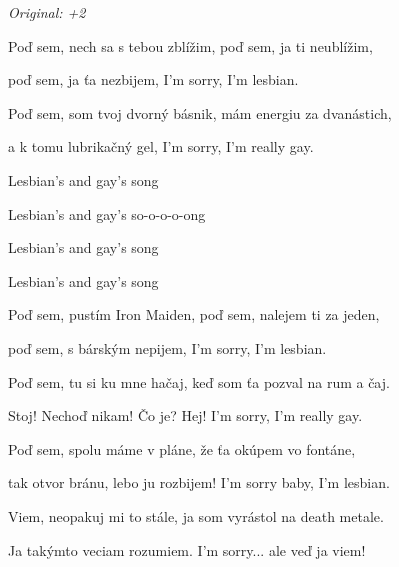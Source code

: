 \begin{song}


 \quad
\textit{Original: +2}

\large


\Large

\bigskip

 Poď sem, nech sa s tebou zblížim,  poď sem, ja ti neublížim, \par
{} poď sem, ja ťa nezbijem,  I'm sorry, I'm lesbian. \par
{} Poď sem, som tvoj dvorný básnik,  mám energiu za dvanástich, \par
{} a k tomu lubrikačný gel,  I'm sorry, I'm really gay. \par

\bigskip

\begin{chorusbox}{\Refren}
Lesbian's and gay's song \par
{}Lesbian's and gay's so-o-o-o-ong \par
{}Lesbian's and gay's song \par
{}Lesbian's and gay's song \par
\end{chorusbox}

\bigskip

 Poď sem, pustím Iron Maiden,  poď sem, nalejem ti za jeden, \par
{} poď sem, s bárským nepijem,  I'm sorry, I'm lesbian. \par
{} Poď sem, tu si ku mne hačaj,  keď som ťa pozval na rum a čaj. \par
{} Stoj! Nechoď nikam! Čo je? Hej!  I'm sorry, I'm really gay. \par

\bigskip

\Refren

\bigskip

 Poď sem, spolu máme v pláne,  že ťa okúpem vo fontáne, \par
{} tak otvor bránu, lebo ju rozbijem!  I'm sorry baby, I'm lesbian. \par
{} Viem, neopakuj mi to stále,  ja som vyrástol na death metale. \par
{} Ja takýmto veciam rozumiem.  I'm sorry... ale veď ja viem! \par

\bigskip

\Refren

\end{song}